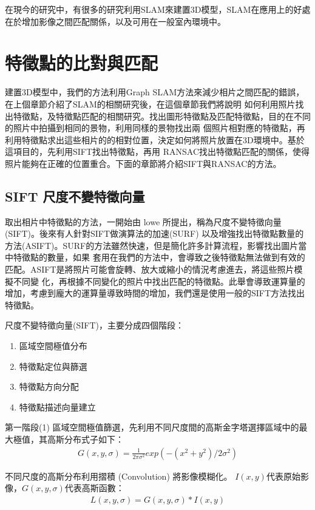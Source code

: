 	在現今的研究中，有很多的研究利用SLAM來建置3D模型，SLAM在應用上的好處在於增加影像之間匹配關係，以及可用在一般室內環境中。


\section{特徵點的比對與匹配}

	建置3D模型中，我們的方法利用Graph SLAM方法來減少相片之間匹配的錯誤，在上個章節介紹了SLAM的相關研究後，在這個章節我們將說明
如何利用照片找出特徵點，及特徵點匹配的相關研究。找出圖形特徵點及匹配特徵點，目的在不同的照片中拍攝到相同的景物，利用同樣的景物找出兩
個照片相對應的特徵點，再利用特徵點求出這些相片的的相對位置，決定如何將照片放置在3D環境中。基於這項目的，先利用SIFT找出特徵點，再用
RANSAC找出特徵點匹配的關係，使得照片能夠在正確的位置重合。下面的章節將介紹SIFT與RANSAC的方法。

	
\subsection{SIFT 尺度不變特徵向量}
	取出相片中特徵點的方法，一開始由 lowe \cite{Lowe2004} 所提出，稱為尺度不變特徵向量(SIFT)。後來有人針對SIFT做演算法的加速(SURF)\cite{Bay2006}
以及增強找出特徵點數量的方法(ASIFT)\cite{Guo2009}。SURF的方法雖然快速，但是簡化許多計算流程，影響找出圖片當中特徵點的數量，如果
套用在我們的方法中，會導致之後特徵點無法做到有效的匹配。ASIFT是將照片可能會旋轉、放大或縮小的情況考慮進去，將這些照片模擬不同變
化，再根據不同變化的照片中找出匹配的特徵點。此舉會導致運算量的增加，考慮到龐大的運算量導致時間的增加，我們還是使用一般的SIFT方法找出特徵點。


	尺度不變特徵向量(SIFT)，主要分成四個階段：

 \begin{enumerate}
	  \item 區域空間極值分布	
	  \item 特徵點定位與篩選
	  \item 特徵點方向分配
	  \item 特徵點描述向量建立
 \end{enumerate}

   第一階段(1) 區域空間極值篩選，先利用不同尺度間的高斯金字塔選擇區域中的最大極值，其高斯分布式子如下：
\begin{align}
  G(x,y,\sigma) = \frac{1}{2\pi\sigma^2}exp(-(x^2+y^2)/2\sigma^2) 
\end{align}

	不同尺度的高斯分布利用摺積 (Convolution) 將影像模糊化。 $I(x,y)$代表原始影像，$G(x,y,\sigma)$代表高斯函數：	
\begin{align}
  L(x,y,\sigma) = G(x,y,\sigma)\ast{I(x,y)}
\end{align}


